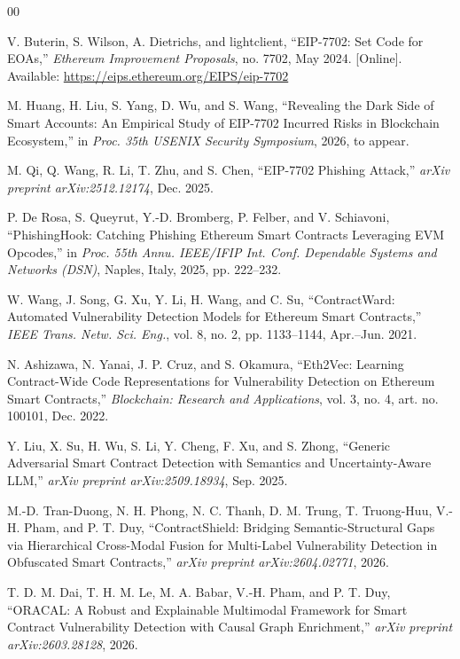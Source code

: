 \documentclass[conference]{IEEEtran}
\begin{document}
\begin{thebibliography}{00}

V. Buterin, S. Wilson, A. Dietrichs, and lightclient, ``EIP-7702: Set Code for EOAs,'' \emph{Ethereum Improvement Proposals}, no. 7702, May 2024. [Online]. Available: \url{https://eips.ethereum.org/EIPS/eip-7702}

M. Huang, H. Liu, S. Yang, D. Wu, and S. Wang, ``Revealing the Dark Side of Smart Accounts: An Empirical Study of EIP-7702 Incurred Risks in Blockchain Ecosystem,'' in \emph{Proc. 35th USENIX Security Symposium}, 2026, to appear.

M. Qi, Q. Wang, R. Li, T. Zhu, and S. Chen, ``EIP-7702 Phishing Attack,'' \emph{arXiv preprint arXiv:2512.12174}, Dec. 2025.

P. De Rosa, S. Queyrut, Y.-D. Bromberg, P. Felber, and V. Schiavoni, ``PhishingHook: Catching Phishing Ethereum Smart Contracts Leveraging EVM Opcodes,'' in \emph{Proc. 55th Annu. IEEE/IFIP Int. Conf. Dependable Systems and Networks (DSN)}, Naples, Italy, 2025, pp. 222--232.

W. Wang, J. Song, G. Xu, Y. Li, H. Wang, and C. Su, ``ContractWard: Automated Vulnerability Detection Models for Ethereum Smart Contracts,'' \emph{IEEE Trans. Netw. Sci. Eng.}, vol. 8, no. 2, pp. 1133--1144, Apr.--Jun. 2021.

N. Ashizawa, N. Yanai, J. P. Cruz, and S. Okamura, ``Eth2Vec: Learning Contract-Wide Code Representations for Vulnerability Detection on Ethereum Smart Contracts,'' \emph{Blockchain: Research and Applications}, vol. 3, no. 4, art. no. 100101, Dec. 2022.

Y. Liu, X. Su, H. Wu, S. Li, Y. Cheng, F. Xu, and S. Zhong, ``Generic Adversarial Smart Contract Detection with Semantics and Uncertainty-Aware LLM,'' \emph{arXiv preprint arXiv:2509.18934}, Sep. 2025.

M.-D. Tran-Duong, N. H. Phong, N. C. Thanh, D. M. Trung, T. Truong-Huu, V.-H. Pham, and P. T. Duy, ``ContractShield: Bridging Semantic-Structural Gaps via Hierarchical Cross-Modal Fusion for Multi-Label Vulnerability Detection in Obfuscated Smart Contracts,'' \emph{arXiv preprint arXiv:2604.02771}, 2026.

T. D. M. Dai, T. H. M. Le, M. A. Babar, V.-H. Pham, and P. T. Duy, ``ORACAL: A Robust and Explainable Multimodal Framework for Smart Contract Vulnerability Detection with Causal Graph Enrichment,'' \emph{arXiv preprint arXiv:2603.28128}, 2026.


\end{thebibliography}
\end{document}
